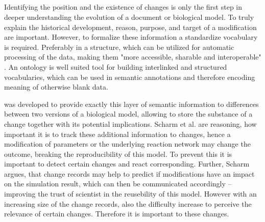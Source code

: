	\subsection{\comodi}
	\label{sec:background:onto:comodi}
	Identifying the position and the existence of changes is only the first step in deeper understanding the evolution of a document or biological model. To truly explain the historical development, reason, purpose, and target of a modification are important. 
	However, to formalize these information a standardize vocabulary is required. Preferably in a structure, which can be utilized for automatic processing of the data, making them "more accessible, sharable and interoperable" \cite{Scharm2016}.
	An ontology is well suited tool for building interlinked and structured vocabularies, which can be used in semantic annotations and therefore encoding meaning of otherwise blank data.
	
	\comodi was developed to provide exactly this layer of semantic information to differences between two versions of a biological model, allowing to store the substance of a change together with its potential implications.
	Scharm et al. are reasoning, how important it is to track these additional information to changes, hence a modification of parameters or the underlying reaction network may change the outcome, breaking the reproducibility of this model. To prevent this it is important to detect certain changes and 
	react corresponding.
	Further, Scharm argues, that change records may help to predict if modifications have an impact on the simulation result, which can then be communicated accordingly -- improving the trust of scientist in the reusebility of this model.
	However with an increasing size of the change records, also the difficulty increase to perceive the relevance of certain changes. Therefore it is important to these changes.
	
